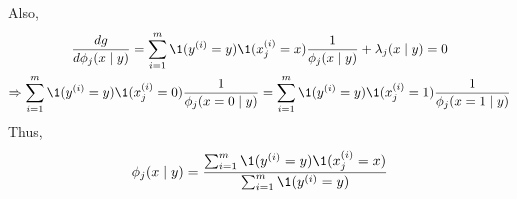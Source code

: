 \documentclass[a4paper]{article}
\begin{document}
\begin{enumerate}
Also, 
\begin{equation*}
  \begin{gathered}
    \frac{dg}{d \phi_j (x \mid y)} = \sum_{i = 1}^m \1 (y^{(i)}=y) \1 (x^{(i)}_j=x) \frac{1}{\phi_j (x \mid y)} + \lambda_j (x \mid y) = 0\\
    \Rightarrow \sum_{i = 1}^m \1 (y^{(i)}=y) \1 (x^{(i)}_j=0) \frac{1}{\phi_j (x=0 \mid y)} = \sum_{i = 1}^m \1 (y^{(i)}=y) \1 (x^{(i)}_j=1) \frac{1}{\phi_j (x=1 \mid y)}\\
  \end{gathered}
\end{equation*}
Thus,
\begin{equation*}
  \phi_j (x \mid y) = \frac{\sum_{i = 1}^m \1 (y^{(i)}=y) \1 (x^{(i)}_j=x)}{\sum_{i = 1}^m \1 (y^{(i)}=y)}
\end{equation*}
\end{enumerate}
  
  
  
\end{document}
